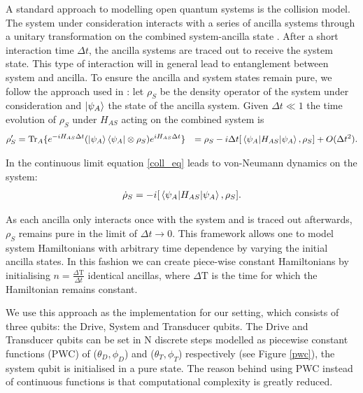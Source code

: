 A standard approach to modelling open quantum systems is the collision model.
The system under consideration interacts with a series of ancilla systems through a unitary transformation on the combined system-ancilla state \cite{Lorenzo_2017}. After a short interaction time $\Delta t$, the ancilla systems are traced out to receive the system state.
This type of interaction will in general lead to entanglement between system and ancilla.
To ensure the ancilla and system states remain pure, we follow the approach used in \cite{beyer2020}:
let $\rho_S$ be the density operator of the system under consideration and $\ket{\psi_A}$ the state of the ancilla system.
Given $\Delta t \ll 1$ the time evolution of $\rho_S$ under $H_{AS}$ acting on the combined system is
\begin{align}\label{coll_eq}
\rho'_S & = \mathrm{Tr}_A \{ e^{-i H_{AS} \Delta t} (\ket{\psi_A} \bra{\psi_A} \otimes \rho_S) e^{i H_{AS} \Delta t} \} & = \rho_S - i \Delta t [\expval{H_{AS}}{\psi_A}, \rho_S] + O(\Delta t^2).
\end{align}

In the continuous limit equation \ref{coll_eq} leads to von-Neumann dynamics on the system:
\begin{align*}
	\dot{\rho}_S = - i [\expval{H_{AS}}{\psi_A}, \rho_S].
\end{align*}

As each ancilla only interacts once with the system and is traced out afterwards, $\rho_S$ remains pure in the limit of $\Delta t \to 0$.
This framework allows one to model system Hamiltonians with arbitrary time dependence by varying the initial ancilla states.
In this fashion we can create piece-wise constant Hamiltonians by initialising $n = \frac{\Delta \mathrm{T}}{\Delta t}$ identical ancillas, where $\Delta \mathrm{T}$ is the time for which the Hamiltonian remains constant.

We use this approach as the implementation for our setting, which consists of three qubits: the Drive, System and Transducer qubits. The Drive and Transducer qubits can be set in N discrete steps modelled as piecewise constant functions (PWC) of ($\theta_D, \phi_D$) and ($\theta_T, \phi_T$) respectively (see Figure \ref{pwc}), the system qubit is initialised in a pure state.
The reason behind using PWC instead of continuous functions is that computational complexity is greatly reduced.

